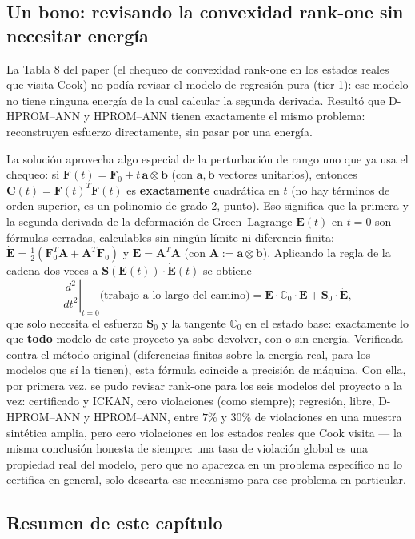 \documentclass[11pt,a4paper]{article}
\begin{document}
\subsection{Un bono: revisando la convexidad rank-one sin necesitar energ\'ia}

La Tabla 8 del paper (el chequeo de convexidad rank-one en los estados
reales que visita Cook) no pod\'ia revisar el modelo de regresi\'on pura
(tier 1): ese modelo no tiene ninguna energ\'ia de la cual calcular la
segunda derivada. Result\'o que D-HPROM--ANN y HPROM--ANN tienen
exactamente el mismo problema: reconstruyen esfuerzo directamente, sin
pasar por una energ\'ia.

La soluci\'on aprovecha algo especial de la perturbaci\'on de rango uno
que ya usa el chequeo: si $\bm F(t)=\bm F_0+t\,\bm a\otimes\bm b$ (con
$\bm a,\bm b$ vectores unitarios), entonces
$\bm C(t)=\bm F(t)^T\bm F(t)$ es \textbf{exactamente} cuadr\'atica en
$t$ (no hay t\'erminos de orden superior, es un polinomio de grado $2$,
punto). Eso significa que la primera y la segunda derivada de la
deformaci\'on de Green--Lagrange $\bm E(t)$ en $t=0$ son f\'ormulas
cerradas, calculables sin ning\'un l\'imite ni diferencia finita:
$\dot{\bm E}=\tfrac12(\bm F_0^T\bm A+\bm A^T\bm F_0)$ y
$\ddot{\bm E}=\bm A^T\bm A$ (con $\bm A:=\bm a\otimes\bm b$). Aplicando
la regla de la cadena dos veces a $\bm S(\bm E(t))\cdot\dot{\bm E}(t)$
se obtiene
\[
 \left.\frac{d^2}{dt^2}\right|_{t=0}\!\!\big(\text{trabajo a lo largo del camino}\big)=\dot{\bm E}\cdot\mathbb C_0\cdot\dot{\bm E}+\bm S_0\cdot\ddot{\bm E},
\]
que solo necesita el esfuerzo $\bm S_0$ y la tangente $\mathbb C_0$ en
el estado base: exactamente lo que \textbf{todo} modelo de este
proyecto ya sabe devolver, con o sin energ\'ia. Verificada contra el
m\'etodo original (diferencias finitas sobre la energ\'ia real, para
los modelos que s\'i la tienen), esta f\'ormula coincide a precisi\'on
de m\'aquina. Con ella, por primera vez, se pudo revisar rank-one para
los seis modelos del proyecto a la vez: certificado y ICKAN, cero
violaciones (como siempre); regresi\'on, libre, D-HPROM--ANN y
HPROM--ANN, entre $7\%$ y $30\%$ de violaciones en una muestra sint\'etica
amplia, pero cero violaciones en los estados reales que Cook visita ---
la misma conclusi\'on honesta de siempre: una tasa de violaci\'on global
es una propiedad real del modelo, pero que no aparezca en un problema
espec\'ifico no lo certifica en general, solo descarta ese mecanismo
para ese problema en particular.

\subsection{Resumen de este cap\'itulo}
\end{document}
